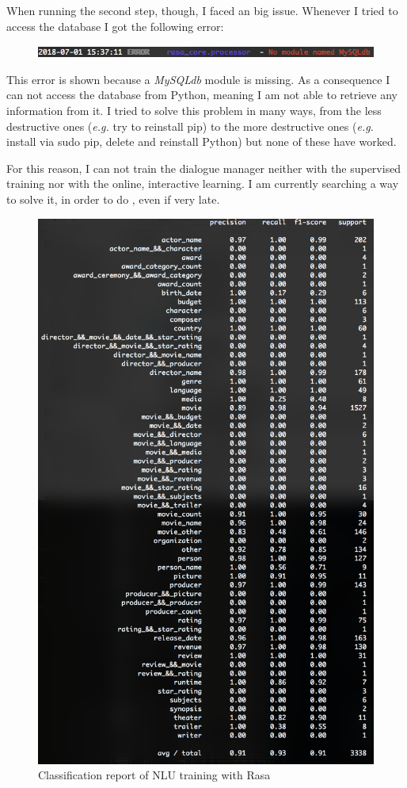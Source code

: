 \documentclass[11pt,a4paper]{article}
\begin{document}
When running the second step, though, I faced an big issue. Whenever I tried to access the database I got the following error:

\begin{figure}[h]
	\includegraphics[scale=.55]{images/error}
\end{figure}

This error is shown because a \textit{MySQLdb} module is missing. As a consequence I can not access the database from Python, meaning I am not able to retrieve any information from it. I tried to solve this problem in many ways, from the less destructive ones (\textit{e.g.} try to reinstall pip) to the more destructive ones (\textit{e.g.} install via sudo pip, delete and reinstall Python) but none of these have worked. 

For this reason, I can not train the dialogue manager neither with the supervised training nor with the online, interactive learning. I am currently searching a way to solve it, in order to do  , even if very late.

\begin{figure}[h]
	\center\includegraphics[scale=.5]{images/results}
	\center\caption{Classification report of NLU training with Rasa}
\end{figure}
\end{document}
